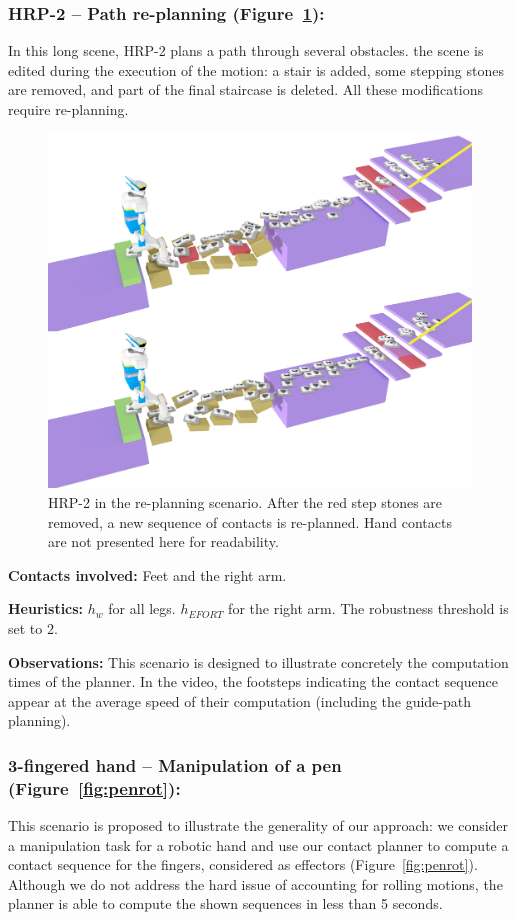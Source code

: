 \subsubsection{HRP-2 -- Path re-planning (Figure~\ref{fig:re-planning}):}
In this long scene, HRP-2 plans a path through several obstacles. the scene is edited during the execution of the motion: a stair is added,
some stepping stones are removed, and part of the final staircase is deleted. All these modifications require re-planning.


\begin{figure}
  \centering
  \includegraphics[width=0.7\linewidth]{figures/replanning}
  \caption{
           HRP-2 in the re-planning scenario. After the red step stones are removed, a new sequence of contacts is re-planned. Hand contacts
           are not presented here for readability.}
		   \label{fig:re-planning}
\end{figure}

\noindent\textbf{Contacts involved:} Feet and the right arm.

\noindent\textbf{Heuristics:} $h_w$  for all legs. $h_{EFORT}$  for the right arm. The robustness threshold is set to $2$.

\noindent\textbf{Observations:} This scenario is designed to illustrate concretely the computation times of the planner.
In the video, the footsteps indicating the contact sequence appear at the average speed of their computation (including the guide-path planning).


\subsubsection{3-fingered hand -- Manipulation of a pen (Figure~\ref{fig:penrot}):}
This scenario is proposed to illustrate the generality of our approach: we consider a manipulation task for a robotic hand and use
our contact planner to compute a contact sequence for the fingers, considered as effectors (Figure~\ref{fig:penrot}).
Although we do not address the hard issue of accounting for rolling motions, the planner is able to compute the shown sequences in less than 5 seconds.


